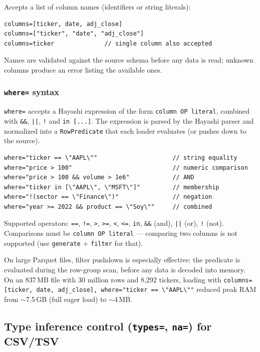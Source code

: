 Accepts a list of column names (identifiers or string literals):

\begin{lstlisting}
columns=[ticker, date, adj_close]
columns=["ticker", "date", "adj_close"]
columns=ticker              // single column also accepted
\end{lstlisting}

Names are validated against the source schema before any data is read;
unknown columns produce an error listing the available ones.

\subsubsection*{\texttt{where=} syntax}

\texttt{where=} accepts a Hayashi expression of the form \texttt{column OP literal},
combined with \texttt{\&\&}, \texttt{||}, \texttt{!} and \texttt{in [...]}.
The expression is parsed by the Hayashi parser and normalized into a
\texttt{RowPredicate} that each loader evaluates (or pushes down to the source).

\begin{lstlisting}
where="ticker == \"AAPL\""                     // string equality
where="price > 100"                            // numeric comparison
where="price > 100 && volume > 1e6"            // AND
where="ticker in [\"AAPL\", \"MSFT\"]"         // membership
where="!(sector == \"Finance\")"               // negation
where="year >= 2022 && product == \"Soy\""     // combined
\end{lstlisting}

Supported operators: \texttt{==}, \texttt{!=}, \texttt{>}, \texttt{>=},
\texttt{<}, \texttt{<=}, \texttt{in}, \texttt{\&\&} (and), \texttt{||} (or),
\texttt{!} (not). Comparisons must be \texttt{column OP literal} --- comparing
two columns is not supported (use \texttt{generate} + \texttt{filter} for that).

\begin{nota}
  On large Parquet files, filter pushdown is especially effective: the
  predicate is evaluated during the row-group scan, before any data is decoded
  into memory. On an 837\,MB file with 30 million rows and 8{,}292 tickers,
  loading with
  \texttt{columns=[ticker, date, adj\_close], where="ticker == \textbackslash"AAPL\textbackslash""}
  reduced peak RAM from $\sim$7.5\,GB (full eager load) to $\sim$4\,MB.
\end{nota}

\subsection*{Type inference control (\texttt{types=}, \texttt{na=}) for CSV/TSV}

